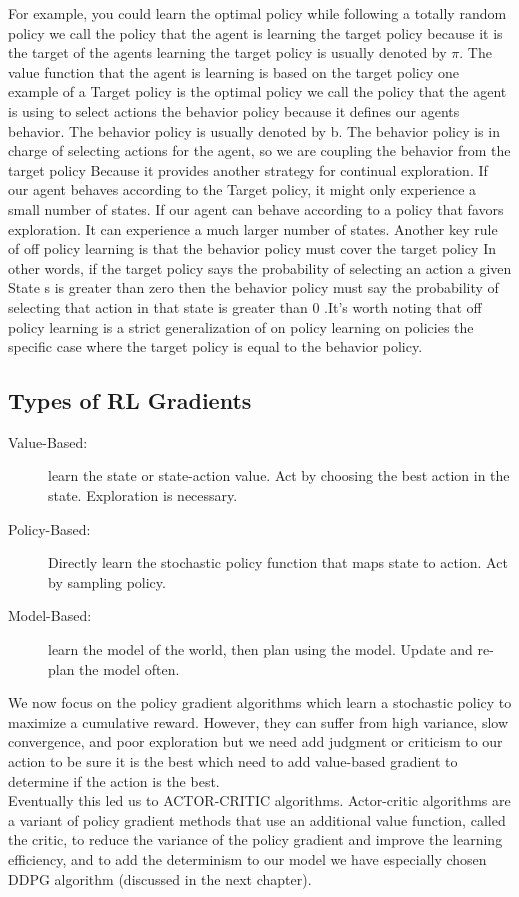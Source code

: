For example, you could learn the optimal policy while following a totally random policy we call the policy that the agent is learning the target policy because it is the target of the agents learning the target policy is usually denoted by $\pi$. The value function that the agent is learning is based on the target policy one example of a Target policy is the optimal policy we call the policy that the agent is using to select actions the behavior policy because it defines our agents behavior. 
The behavior policy is usually denoted by b. The behavior policy is in charge of selecting actions for the agent, so we are coupling the behavior from the target policy Because it provides another strategy for continual exploration. If our agent behaves according to the Target policy, it might only experience a small number of states. If our agent can behave according to a policy that favors exploration. It can experience a much larger number of states. 
Another key rule of off policy learning is that the behavior policy must cover the target policy In other words, if the target policy says the probability of selecting an action a given State s is greater than zero then the behavior policy must say the probability of selecting that action in that state is greater than 0 .It's worth noting that off policy learning is a strict generalization of on policy learning on policies the specific case where the target policy is equal to the behavior policy.

\subsection{Types of RL Gradients}
\begin{description}
    \item[Value-Based:] learn the state or state-action value. Act by choosing the best action in the state. Exploration is necessary.
    \item[Policy-Based:] Directly learn the stochastic policy function that maps state to action. Act by sampling policy.
    \item[Model-Based:] learn the model of the world, then plan using the model. Update and re-plan the model often.
\end{description}

We now focus on the policy gradient algorithms which learn a stochastic policy to maximize a cumulative reward.
However, they can suffer from high variance, slow convergence, and poor exploration but we need add judgment or criticism to our action to be sure it is the best which need to add value-based gradient to determine if the action is the best. \\

Eventually this led us to ACTOR-CRITIC algorithms. Actor-critic algorithms are a variant of policy gradient methods that use an additional value function, called the critic, to reduce the variance of the policy gradient and improve the learning efficiency, and to add the determinism to our model we have especially chosen DDPG algorithm (discussed in the next chapter).
